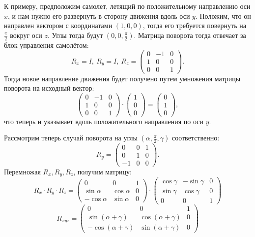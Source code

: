 \documentclass[fleqn]{extarticle}
\begin{document}
	К примеру, предположим самолет, летящий по положительному направлению оси $x$, и нам нужно его развернуть в сторону движения вдоль оси $y$. 
	Положим, что он направлен вектором с координатами $(1, 0, 0)$, тогда его требуется повернуть на $\frac{\pi}{2}$ вокруг оси $z$. Углы тогда будут $\left(0, 0, \frac{\pi}{2} \right)$. 
	Матрица поворота тогда отвечает за блок управления самолётом:
	\[ R_x = I, ~ R_y = I, ~ R_z = \begin{pmatrix} 0 & -1 & 0 \\ 1 & 0 & 0 \\ 0 & 0 & 1 \end{pmatrix}. \]
	Тогда новое направление движения будет получено путем умножения матрицы поворота на исходный вектор:
	\[ \begin{pmatrix} 0 & -1 & 0 \\ 1 & 0 & 0 \\ 0 & 0 & 1 \end{pmatrix} \cdot \begin{pmatrix} 1 \\ 0 \\ 0 \end{pmatrix} = \begin{pmatrix} 0 \\ 1 \\ 0 \end{pmatrix}, \]
	что теперь и указывает вдоль положительного направления по оси $y$.

	Рассмотрим теперь случай поворота на углы $\left(\alpha, \frac{\pi}{2}, \gamma \right)$ соответственно:
	\[ R_y = \begin{pmatrix} 0 & 0 & 1 \\ 0 & 1 & 0 \\ -1 & 0 & 0 \end{pmatrix}. \]
	Перемножая $R_x, R_y, R_z$, получим матрицу:
	\[ R_x \cdot R_y \cdot R_z = \begin{pmatrix} 
		0 & 0 & 1 \\ \sin{\alpha} & \cos{\alpha} & 0 \\ -\cos{\alpha} & \sin{\alpha} & 0 
	\end{pmatrix} \cdot \begin{pmatrix} 
		\cos{\gamma} & -\sin{\gamma} & 0 \\ \sin{\gamma} & \cos{\gamma} & 0 \\ 0 & 0 & 1 
	\end{pmatrix} \]
	\[ R_{xyz} = \begin{pmatrix} 
		0 & 0 & 1 \\ \sin(\alpha + \gamma) & \cos(\alpha + \gamma) & 0 \\ -\cos(\alpha + \gamma) & \sin(\alpha + \gamma) & 0
	\end{pmatrix} \]
\end{document}
